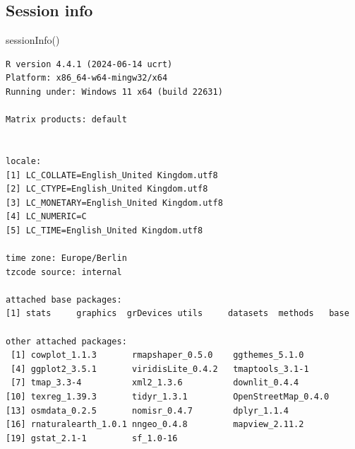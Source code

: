 \documentclass[
  letterpaper,
  DIV=11,
  numbers=noendperiod]{scrreprt}
\newenvironment{Shaded}{\begin{snugshade}}{\end{snugshade}}
\newcommand{\FunctionTok}[1]{\textcolor[rgb]{0.28,0.35,0.67}{#1}}
\newcommand{\NormalTok}[1]{\textcolor[rgb]{0.00,0.23,0.31}{#1}}
\begin{document}
\hypertarget{session-info-1}{%
\subsection*{Session info}\label{session-info-1}}

\begin{Shaded}
\begin{Highlighting}[]
\FunctionTok{sessionInfo}\NormalTok{()}
\end{Highlighting}
\end{Shaded}

\begin{verbatim}
R version 4.4.1 (2024-06-14 ucrt)
Platform: x86_64-w64-mingw32/x64
Running under: Windows 11 x64 (build 22631)

Matrix products: default


locale:
[1] LC_COLLATE=English_United Kingdom.utf8 
[2] LC_CTYPE=English_United Kingdom.utf8   
[3] LC_MONETARY=English_United Kingdom.utf8
[4] LC_NUMERIC=C                           
[5] LC_TIME=English_United Kingdom.utf8    

time zone: Europe/Berlin
tzcode source: internal

attached base packages:
[1] stats     graphics  grDevices utils     datasets  methods   base     

other attached packages:
 [1] cowplot_1.1.3       rmapshaper_0.5.0    ggthemes_5.1.0     
 [4] ggplot2_3.5.1       viridisLite_0.4.2   tmaptools_3.1-1    
 [7] tmap_3.3-4          xml2_1.3.6          downlit_0.4.4      
[10] texreg_1.39.3       tidyr_1.3.1         OpenStreetMap_0.4.0
[13] osmdata_0.2.5       nomisr_0.4.7        dplyr_1.1.4        
[16] rnaturalearth_1.0.1 nngeo_0.4.8         mapview_2.11.2     
[19] gstat_2.1-1         sf_1.0-16          


\end{verbatim}
\end{document}
